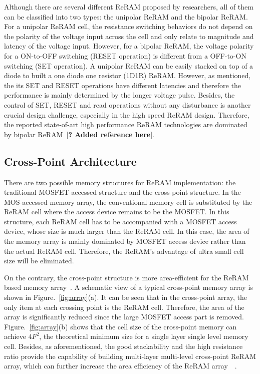 Although there are several different ReRAM proposed by researchers, all of them can be classified into two types: the unipolar ReRAM and the bipolar ReRAM. For a unipolar ReRAM cell, the resistance switching behaviors do not depend on the polarity of the voltage input across the cell and only relate to magnitude and latency of the voltage input. However, for a bipolar ReRAM, the voltage polarity for a ON-to-OFF switching (RESET operation) is different from a OFF-to-ON switching (SET operation). A unipolar ReRAM can be easily stacked on top of a diode to built a one diode one resistor (1D1R) ReRAM. However, as mentioned, the its SET and RESET operations have different latencies and therefore the performance is mainly determined by the longer voltage pulse. Besides, the control of SET, RESET and read operations without any disturbance is another crucial design challenge, especially in the high speed ReRAM design. Therefore, the reported state-of-art high performance ReRAM technologies are dominated by bipolar ReRAM~[\textbf{? Added reference here}].

\subsection{Cross-Point Architecture}
There are two possible memory structures for ReRAM implementation: the traditional MOSFET-accessed structure and the cross-point structure. In the MOS-accessed memory array, the conventional memory cell is substituted by the ReRAM cell where the access device remains to be the MOSFET. In this structure, each ReRAM cell has to be accompanied with a MOSFET access device, whose size is much larger than the ReRAM cell. In this case, the area of the memory array is mainly dominated by MOSFET access device rather than the actual ReRAM cell. Therefore, the ReRAM's advantage of ultra small cell size will be eliminated.

On the contrary, the cross-point structure is more area-efficient for the ReRAM based memory array~\cite{memristor:Cong}. A schematic view of a typical cross-point memory array is shown in Figure.~\ref{fig:array}(a). It can be seen that in the cross-point array, the only item at each crossing point is the ReRAM cell. Therefore, the area of the array is significantly reduced since the large MOSFET access part is removed. Figure.~\ref{fig:array}(b) shows that the cell size of the cross-point memory can achieve $4F^2$, the theoretical minimum size for a single layer single level memory cell. Besides, as aforementioned, the good stackability and the high resistance ratio provide the capability of building multi-layer multi-level cross-point ReRAM array, which can further increase the area efficiency of the ReRAM array~\cite{memristor:ISSCC2011_ITRI}~\cite{memristor:IEDM08_3D}.


